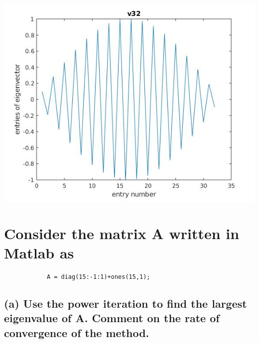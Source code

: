 \documentclass[12pt]{article}
\begin{document}
        \includegraphics[scale=0.5]{v32.jpg}\\
    
    \section{Consider the matrix A written in Matlab as}
        \begin{lstlisting}
            A = diag(15:-1:1)+ones(15,1);
        \end{lstlisting}
        \subsection*{(a) Use the power iteration to find the largest eigenvalue of A. Comment on the
        rate of convergence of the method.}
\end{document}
